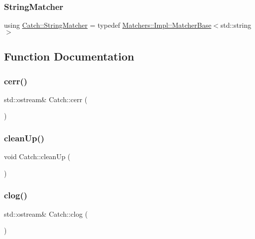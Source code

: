 \mbox{\label{namespace_catch_aba438977e831821a2eeca82b9b4f4af2}} 
\subsubsection{\texorpdfstring{String\+Matcher}{StringMatcher}}
{\footnotesize\ttfamily using \mbox{\hyperlink{namespace_catch_aba438977e831821a2eeca82b9b4f4af2}{Catch\+::\+String\+Matcher}} = typedef \mbox{\hyperlink{struct_catch_1_1_matchers_1_1_impl_1_1_matcher_base}{Matchers\+::\+Impl\+::\+Matcher\+Base}}$<$std\+::string$>$}



\subsection{Function Documentation}
\mbox{\label{namespace_catch_a4e5b5dc07abdfa30de33593dfab71f43}} 
\subsubsection{\texorpdfstring{cerr()}{cerr()}}
{\footnotesize\ttfamily std\+::ostream\& Catch\+::cerr (\begin{DoxyParamCaption}{ }\end{DoxyParamCaption})}

\mbox{\label{namespace_catch_a0f78e9afdebc6d4512d18e76fbf54b8c}} 
\subsubsection{\texorpdfstring{clean\+Up()}{cleanUp()}}
{\footnotesize\ttfamily void Catch\+::clean\+Up (\begin{DoxyParamCaption}{ }\end{DoxyParamCaption})}

\mbox{\label{namespace_catch_a5a0677089050dcdb4848f56fb47e9279}} 
\subsubsection{\texorpdfstring{clog()}{clog()}}
{\footnotesize\ttfamily std\+::ostream\& Catch\+::clog (\begin{DoxyParamCaption}{ }\end{DoxyParamCaption})}

